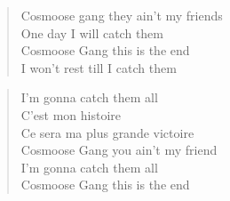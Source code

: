 \begin{verse}
Cosmoose gang they ain't my friends\\
One day I will catch them\\
Cosmoose Gang this is the end\\
I won't rest till I catch them
\end{verse}

\begin{verse}
I'm gonna catch them all\\
C'est mon histoire\\
Ce sera ma plus grande victoire\\
Cosmoose Gang you ain't my friend\\
I'm gonna catch them all \\
Cosmoose Gang this is the end
\end{verse}

\clearpage
